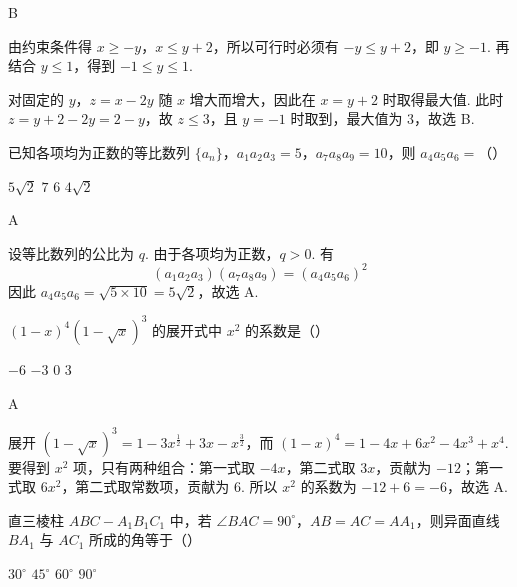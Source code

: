 \begin{answer}
B
\end{answer}

\begin{solution}
由约束条件得 \(x\geqslant-y\)，\(x\leqslant y+2\)，所以可行时必须有
\(-y\leqslant y+2\)，即 \(y\geqslant-1\). 再结合 \(y\leqslant1\)，得到
\(-1\leqslant y\leqslant1\).

对固定的 \(y\)，\(z=x-2y\) 随 \(x\) 增大而增大，因此在 \(x=y+2\) 时取得最大值. 此时
\(z=y+2-2y=2-y\)，故 \(z\leqslant3\)，且 \(y=-1\) 时取到，最大值为 \(3\)，故选 B.
\end{solution}

\begin{problem}
已知各项均为正数的等比数列 \(\{a_{n}\}\)，\(a_{1}a_{2}a_{3} = 5\)，\(a_{7}a_{8}a_{9} = 10\)，则 \(a_{4}a_{5}a_{6} =\)（\quad）

\choices
    {\(5 \sqrt{2}\)}
    {\(7\)}
    {\(6\)}
    {\(4 \sqrt{2}\)}
\end{problem}

\begin{answer}
A
\end{answer}

\begin{solution}
设等比数列的公比为 \(q\). 由于各项均为正数，\(q>0\). 有
\[
(a_1a_2a_3)(a_7a_8a_9)=(a_4a_5a_6)^2
\]
因此
\(a_4a_5a_6=\sqrt{5\times10}=5\sqrt{2}\)，故选 A.
\end{solution}

\begin{problem}
\(\left(1-x\right)^{4}\left(1-\sqrt{x}\right)^{3}\) 的展开式中 \(x^{2}\) 的系数是（\quad）

\choices
    {\(-6\)}
    {\(-3\)}
    {\(0\)}
    {\(3\)}
\end{problem}

\begin{answer}
A
\end{answer}

\begin{solution}
展开 \((1-\sqrt{x})^3=1-3x^{\frac{1}{2}}+3x-x^{\frac{3}{2}}\)，而
\((1-x)^4=1-4x+6x^2-4x^3+x^4\).
要得到 \(x^2\) 项，只有两种组合：第一式取 \(-4x\)，第二式取 \(3x\)，贡献为 \(-12\)；第一式取 \(6x^2\)，第二式取常数项，贡献为 \(6\). 所以 \(x^2\) 的系数为 \(-12+6=-6\)，故选 A.
\end{solution}

\begin{problem}
直三棱柱 \(ABC - A_{1}B_{1}C_{1}\) 中，若 \(\angle BAC = 90^{\circ}\)，\(AB = AC = AA_{1}\)，则异面直线 \(BA_{1}\) 与 \(AC_{1}\) 所成的角等于（\quad）

\choices
    {\(30^{\circ}\)}
    {\(45^{\circ}\)}
    {\(60^{\circ}\)}
    {\(90^{\circ}\)}
\end{problem}

